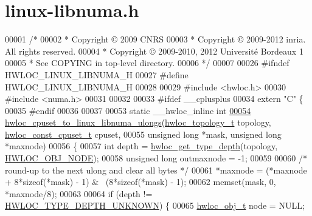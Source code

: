 \hypertarget{a00034_source}{
\section{linux-\/libnuma.h}
}

\begin{DoxyCode}
00001 \textcolor{comment}{/*}
00002 \textcolor{comment}{ * Copyright © 2009 CNRS}
00003 \textcolor{comment}{ * Copyright © 2009-2012 inria.  All rights reserved.}
00004 \textcolor{comment}{ * Copyright © 2009-2010, 2012 Université Bordeaux 1}
00005 \textcolor{comment}{ * See COPYING in top-level directory.}
00006 \textcolor{comment}{ */}
00007 
00026 \textcolor{preprocessor}{#ifndef HWLOC\_LINUX\_LIBNUMA\_H}
00027 \textcolor{preprocessor}{}\textcolor{preprocessor}{#define HWLOC\_LINUX\_LIBNUMA\_H}
00028 \textcolor{preprocessor}{}
00029 \textcolor{preprocessor}{#include <hwloc.h>}
00030 \textcolor{preprocessor}{#include <numa.h>}
00031 
00032 
00033 \textcolor{preprocessor}{#ifdef \_\_cplusplus}
00034 \textcolor{preprocessor}{}\textcolor{keyword}{extern} \textcolor{stringliteral}{"C"} \{
00035 \textcolor{preprocessor}{#endif}
00036 \textcolor{preprocessor}{}
00037 
00053 \textcolor{keyword}{static} \_\_hwloc\_inline \textcolor{keywordtype}{int}
\hypertarget{a00034_source_l00054}{}\hyperlink{a00068_ga018e57a42a780ce2ba2e35ef975d8888}{00054} \hyperlink{a00068_ga018e57a42a780ce2ba2e35ef975d8888}{hwloc_cpuset_to_linux_libnuma_ulongs}(\hyperlink{a00039_ga9d1e76ee15a7dee158b786c30b6a6e38}{hwloc_topology_t} topology, 
      \hyperlink{a00040_ga1f784433e9b606261f62d1134f6a3b25}{hwloc_const_cpuset_t} cpuset,
00055                                     \textcolor{keywordtype}{unsigned} \textcolor{keywordtype}{long} *mask, \textcolor{keywordtype}{unsigned} \textcolor{keywordtype}{long} *maxnode)
00056 \{
00057   \textcolor{keywordtype}{int} depth = \hyperlink{a00046_gaea7c64dd59467f5201ba87712710b14d}{hwloc_get_type_depth}(topology, \hyperlink{a00041_ggacd37bb612667dc437d66bfb175a8dc55aaf0964881117bdedf1a5e9332cd120dd}{HWLOC_OBJ_NODE});
00058   \textcolor{keywordtype}{unsigned} \textcolor{keywordtype}{long} outmaxnode = -1;
00059 
00060   \textcolor{comment}{/* round-up to the next ulong and clear all bytes */}
00061   *maxnode = (*maxnode + 8*\textcolor{keyword}{sizeof}(*mask) - 1) & ~(8*\textcolor{keyword}{sizeof}(*mask) - 1);
00062   memset(mask, 0, *maxnode/8);
00063 
00064   \textcolor{keywordflow}{if} (depth != \hyperlink{a00046_ggaf4e663cf42bbe20756b849c6293ef575a0565ab92ab72cb0cec91e23003294aad}{HWLOC_TYPE_DEPTH_UNKNOWN}) \{
00065     \hyperlink{a00016}{hwloc_obj_t} node = NULL;

\end{DoxyCode}
